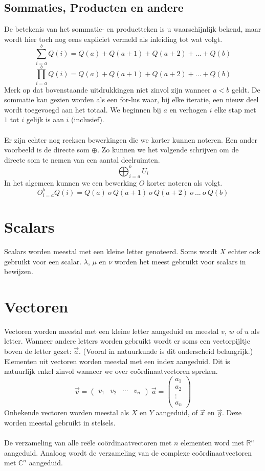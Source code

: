 \documentclass[lineaire_algebra_oplossingen.tex]{subfiles}
\begin{document}
\subsection{Sommaties, Producten en andere}
De betekenis van het sommatie- en productteken is u waarschijnlijk bekend, maar wordt hier toch nog eens expliciet vermeld als inleiding tot wat volgt. 
\[
\sum_{i=a}^bQ(i) = Q(a) + Q(a+1)+ Q(a+2) + ... + Q(b) 
\]
\[
\prod_{i=a}^bQ(i) = Q(a) + Q(a+1)+ Q(a+2) + ... + Q(b) 
\]
Merk op dat bovenstaande uitdrukkingen niet zinvol zijn wanneer $a < b$ geldt.
De sommatie kan gezien worden als een for-lus waar, bij elke iteratie, een nieuw deel wordt toegevoegd aan het totaal.
We beginnen bij $a$ en verhogen $i$ elke stap met $1$ tot $i$ gelijk is aan $i$ (inclusief).\\\\
Er zijn echter nog reeksen bewerkingen die we korter kunnen noteren. 
Een ander voorbeeld is de directe som $\oplus$. Zo kunnen we het volgende schrijven om de directe som te nemen van een aantal deelruimten.
\[
\bigoplus_{i=a}^bU_i
\]
In het algemeen kunnen we een bewerking $O$ korter noteren als volgt.
\[
O_{i=a}^bQ(i) = Q(a)\ o\ Q(a+1)\ o\ Q(a+2)\ o\ ...\ o\ Q(b) 
\]

\section{Scalars}
Scalars worden meestal met een kleine letter genoteerd. Soms wordt $X$ echter ook gebruikt voor een scalar. $\lambda$, $\mu$ en $\nu$ worden het meest gebruikt voor scalars in bewijzen.

\section{Vectoren}
Vectoren worden meestal met een kleine letter aangeduid en meestal $v$, $w$ of $u$ als letter.
Wanneer andere letters worden gebruikt wordt er soms een vectorpijltje boven de letter gezet: $\vec{a}$. (Vooral in natuurkunde is dit onderscheid belangrijk.)
Elementen uit vectoren worden meestal met een index aangeduid. Dit is natuurlijk enkel zinvol wanneer we over co\"ordinaatvectoren spreken.
\[
\vec{v} = 
\begin{pmatrix}
v_{1}&v_{2}&\cdots&v_{n}
\end{pmatrix}
\ 
\vec{a} = 
\begin{pmatrix}
a_{1}\\a_{2}\\\vdots\\a_{n}
\end{pmatrix}
\]
Onbekende vectoren worden meestal als $X$ en $Y$ aangeduid, of $\vec{x}$ en $\vec{y}$. Deze worden meestal gebruikt in stelsels.\\\\
De verzameling van alle re\"ele co\"ordinaatvectoren met $n$ elementen word met $\mathbb{R}^n$ aangeduid. Analoog wordt de verzameling van de complexe co\"ordinaatvectoren met $\mathbb{C}^n$ aangeduid.
\end{document}
